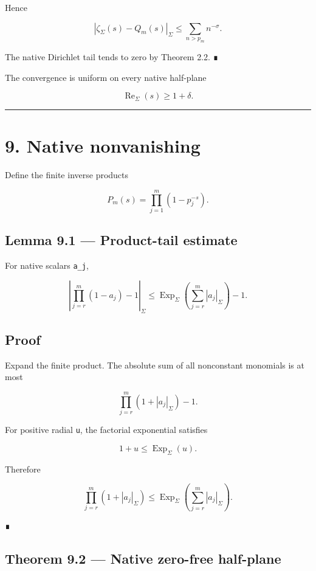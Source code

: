 Hence

\[
|\zeta_\Sigma(s)-Q_m(s)|_\Sigma
\le
\sum_{n>p_m}n^{-\sigma}.
\]

The native Dirichlet tail tends to zero by Theorem 2.2. ∎

The convergence is uniform on every native half-plane

\[
\operatorname{Re}_\Sigma(s)\ge1+\delta.
\]

\begin{center}\rule{0.5\linewidth}{0.5pt}\end{center}

\hypertarget{native-nonvanishing}{%
\section{9. Native nonvanishing}\label{native-nonvanishing}}

Define the finite inverse products

\[
P_m(s)=\prod_{j=1}^{m}(1-p_j^{-s}).
\]

\hypertarget{lemma-9.1-product-tail-estimate}{%
\subsection{Lemma 9.1 --- Product-tail estimate}\label{lemma-9.1-product-tail-estimate}}

For native scalars \texttt{a\_j},

\[
\left|
\prod_{j=r}^{m}(1-a_j)-1
\right|_\Sigma
\le
\operatorname{Exp}_\Sigma
\left(
\sum_{j=r}^{m}|a_j|_\Sigma
\right)-1.
\]

\hypertarget{proof-12}{%
\subsection{Proof}\label{proof-12}}

Expand the finite product. The absolute sum of all nonconstant monomials is at
most

\[
\prod_{j=r}^{m}(1+|a_j|_\Sigma)-1.
\]

For positive radial \texttt{u}, the factorial exponential satisfies

\[
1+u\le\operatorname{Exp}_\Sigma(u).
\]

Therefore

\[
\prod_{j=r}^{m}(1+|a_j|_\Sigma)
\le
\operatorname{Exp}_\Sigma
\left(
\sum_{j=r}^{m}|a_j|_\Sigma
\right).
\]

∎

\hypertarget{theorem-9.2-native-zero-free-half-plane}{%
\subsection{Theorem 9.2 --- Native zero-free half-plane}\label{theorem-9.2-native-zero-free-half-plane}}

